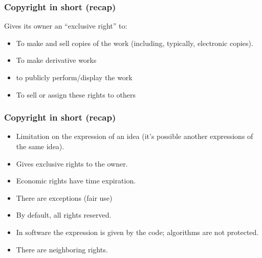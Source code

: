 
\begin{frame}
\frametitle{Copyright in short (recap)}

Gives its owner an ``exclusive right'' to:

\begin{itemize}
\item To make and sell copies of the work (including,
typically, electronic copies).
\item To make derivative works
\item to publicly perform/display the work
\item To sell or assign these rights to others
\end{itemize}

\end{frame}



\begin{frame}
\frametitle{Copyright in short (recap)}

\begin{itemize}
\item Limitation on the \alert{expression} of an idea (it's possible another expressions of the same idea).
\item Gives exclusive rights to the owner.
\item Economic rights have time expiration.
\item There are exceptions (fair use)
\item By default, all rights reserved.
\item In software the expression is given by the code; algorithms are
not protected.
\item There are neighboring rights.

\end{itemize}

\end{frame}




